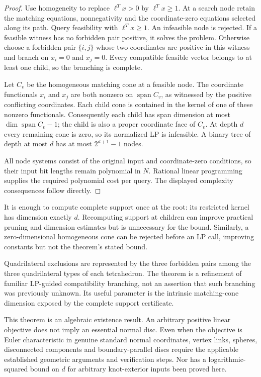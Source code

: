 \begin{proof}
Use homogeneity to replace $\ell^Tx>0$ by $\ell^Tx\geq1$.
At a search node retain the matching equations, nonnegativity and
the coordinate-zero equations selected along its path.  Query
feasibility with $\ell^Tx\geq1$.  An infeasible node is rejected.
If a feasible witness has no forbidden pair positive, it solves the
problem.  Otherwise choose a forbidden pair $\{i,j\}$ whose two
coordinates are positive in this witness and branch on $x_i=0$ and
$x_j=0$.  Every compatible feasible vector belongs to at least one
child, so the branching is complete.

Let $C_v$ be the homogeneous matching cone at a feasible node.
The coordinate functionals $x_i$ and $x_j$ are both nonzero on
$\operatorname{span}C_v$, as witnessed by the positive conflicting
coordinates.  Each child cone is contained in the kernel of one of
these nonzero functionals.  Consequently each child has span
dimension at most $\dim\operatorname{span}C_v-1$; the child is also
a proper coordinate face of $C_v$.  At depth $d$ every remaining
cone is zero, so its normalized LP is infeasible.  A binary tree of
depth at most $d$ has at most $2^{d+1}-1$ nodes.

All node systems consist of the original input and coordinate-zero
conditions, so their input bit lengths remain polynomial in $N$.
Rational linear programming supplies the required polynomial cost per
query.  The displayed complexity consequences follow directly.
\end{proof}

It is enough to compute complete support once at the root: its
restricted kernel has dimension exactly $d$.  Recomputing support at
children can improve practical pruning and dimension estimates but is
unnecessary for the bound.  Similarly, a zero-dimensional homogeneous
cone can be rejected before an LP call, improving constants but not
the theorem's stated bound.

Quadrilateral exclusions are represented by the three forbidden pairs
among the three quadrilateral types of each tetrahedron.  The theorem
is a refinement of familiar LP-guided compatibility branching, not an
assertion that such branching was previously unknown.  Its useful
parameter is the intrinsic matching-cone dimension exposed by the
complete support certificate.

This theorem is an algebraic existence result.  An arbitrary positive
linear objective does not imply an essential normal disc.  Even when
the objective is Euler characteristic in genuine standard normal
coordinates, vertex links, spheres, disconnected components and
boundary-parallel discs require the applicable established geometric
arguments and verification steps.  Nor has a logarithmic-squared
bound on $d$ for arbitrary knot-exterior inputs been proved here.
